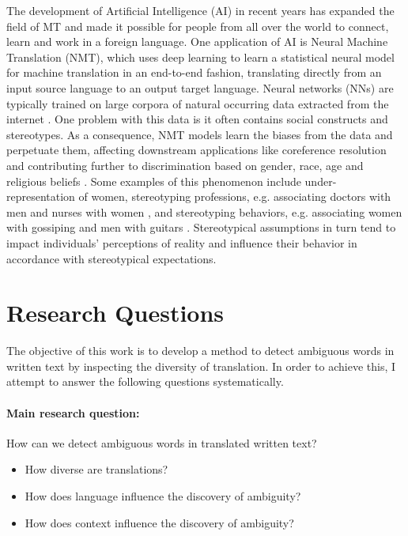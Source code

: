 The development of Artificial Intelligence (AI) in recent years has expanded the field of MT and made it possible for people from all over the world to connect, learn and work in a foreign language. One application of AI is Neural Machine Translation (NMT), which uses deep learning to learn a statistical neural model for machine translation in an end-to-end fashion, translating directly from an input source language to an output target language. Neural networks (NNs) are typically trained on large corpora of natural occurring data extracted from the internet \parencite{NMT}. 
One problem with this data is it often contains social constructs and stereotypes. As a consequence, NMT models learn the biases from the data and perpetuate them, affecting downstream applications like coreference resolution \parencite{Zhao_2018_coreference} and contributing further to discrimination based on gender, race, age and religious beliefs \parencite{Rudinger_2017}. Some examples of this phenomenon include under-representation of women, stereotyping professions, e.g. associating doctors with men and nurses with women \parencite{Escud_Font_2019}, and stereotyping behaviors, e.g. associating women with gossiping and men with guitars \parencite{Rudinger_2017}. Stereotypical assumptions in turn tend to impact individuals' perceptions of reality and influence their behavior in accordance with stereotypical expectations.

\section{Research Questions}
\label{sec:Introduction:Questions}

The objective of this work is to develop a method to detect ambiguous words in written text by inspecting the diversity of translation. In order to achieve this, I attempt to answer the following questions systematically.

\paragraph{Main research question: } How can we detect ambiguous words in translated written text?
\begin{itemize}
    \item How diverse are translations? %
    \item How does language influence the discovery of ambiguity? %
    \item How does context influence the discovery of ambiguity? 
\end{itemize}

